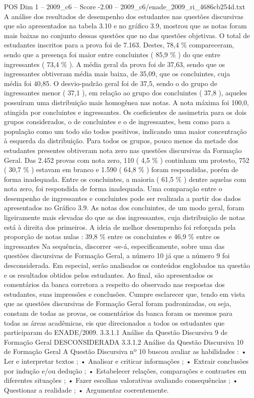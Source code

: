 \begin{textsample}{POS Dim 1 – 2009\_c6 – Score -2.00 – 2009\_c6/enade\_2009\_ri\_4686cb254d.txt}
A análise dos resultados de desempenho dos estudantes nas questões discursivas que são apresentados na tabela 3.10 e no gráfico 3.9, mostrou que as notas foram mais baixas no conjunto dessas questões que no das questões objetivas.
O total de estudantes inscritos para a prova foi de 7.163.
Destes, 78,4 \% compareceram, sendo que a presença foi maior entre concluintes ( 85,9 \% ) do que entre ingressantes ( 73,4 \% ).
A média geral da prova foi de 37,63, sendo que os ingressantes obtiveram média mais baixa, de 35,09, que os concluintes, cuja média foi 40,85.
O desvio-padrão geral foi de 37,5, sendo o do grupo de ingressantes menor ( 37,1 ), em relação ao grupo dos concluintes ( 37,8 ), aqueles possuíram uma distribuição mais homogênea nas notas.
A nota máxima foi 100,0, atingida por concluintes e ingressantes.
Os coeficientes de assimetria para os dois grupos considerados, o de concluintes e o de ingressantes, bem como para a população como um todo são todos positivos, indicando uma maior concentração à esquerda da distribuição.
Para todos os grupos, pouco menos da metade dos estudantes presentes obtiveram nota zero nas questões discursivas da Formação Geral.
Das 2.452 provas com nota zero, 110 ( 4,5 \% ) continham um protesto, 752 ( 30,7 \% ) estavam em branco e 1.590 ( 64,8 \% ) foram respondidas, porém de forma inadequada.
Entre os concluintes, a maioria ( 61,5 \% ) dentre aquelas com nota zero, foi respondida de forma inadequada.
Uma comparação entre o desempenho de ingressantes e concluintes pode ser realizada a partir dos dados apresentados no Gráfico 3.9.
As notas dos concluintes, de um modo geral, foram ligeiramente mais elevadas do que as dos ingressantes, cuja distribuição de notas está à direita dos primeiros.
A ideia de melhor desempenho foi reforçada pela proporção de notas nulas : 39,8 \% entre os concluintes e 46,9 \% entre os ingressantes Na sequência, discorrer -se-á, especificamente, sobre uma das questões discursivas de Formação Geral, a número 10 já que a número 9 foi desconsiderada.
Em especial, serão analisados os conteúdos englobados na questão e os resultados obtidos pelos estudantes.
Ao final, são apresentados os comentários da banca corretora a respeito do observado nas respostas dos estudantes, suas impressões e conclusões.
Cumpre esclarecer que, tendo em vista que as questões discursivas de Formação Geral foram padronizadas, ou seja, constam de todas as provas, os comentários da banca foram os mesmos para todas as áreas acadêmicas, eis que direcionados a todos os estudantes que participaram do ENADE/2009. 3.3.1.1 Análise da Questão Discursiva 9 de Formação Geral DESCONSIDERADA 3.3.1.2 Análise da Questão Discursiva 10 de Formação Geral A Questão Discursiva nº 10 buscou avaliar as habilidades : • Ler e interpretar textos ; • Analisar e criticar informações ; • Extrair conclusões por indução e/ou dedução ; • Estabelecer relações, comparações e contrastes em diferentes situações ; • Fazer escolhas valorativas avaliando consequências ; • Questionar a realidade ; • Argumentar coerentemente.

\end{textsample}
